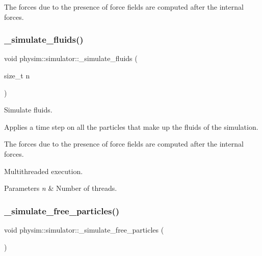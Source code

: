 The forces due to the presence of force fields are computed after the internal forces. \mbox{\label{classphysim_1_1simulator_a5b0b7e9c7790144f17d5de13c8d098dc}} 
\subsubsection{\texorpdfstring{\+\_\+simulate\+\_\+fluids()}{\_simulate\_fluids()}\hspace{0.1cm}{\footnotesize\ttfamily [2/2]}}
{\footnotesize\ttfamily void physim\+::simulator\+::\+\_\+simulate\+\_\+fluids (\begin{DoxyParamCaption}\item[{size\+\_\+t}]{n }\end{DoxyParamCaption})\hspace{0.3cm}{\ttfamily [private]}}



Simulate fluids. 

Applies a time step on all the particles that make up the fluids of the simulation.

The forces due to the presence of force fields are computed after the internal forces.

Multithreaded execution. 
\begin{DoxyParams}{Parameters}
{\em n} & Number of threads. \\
\hline
\end{DoxyParams}
\mbox{\label{classphysim_1_1simulator_ae553797df3ee38cfe3c93bbc0b94be06}} 
\subsubsection{\texorpdfstring{\+\_\+simulate\+\_\+free\+\_\+particles()}{\_simulate\_free\_particles()}}
{\footnotesize\ttfamily void physim\+::simulator\+::\+\_\+simulate\+\_\+free\+\_\+particles (\begin{DoxyParamCaption}{ }\end{DoxyParamCaption})\hspace{0.3cm}{\ttfamily [private]}}



